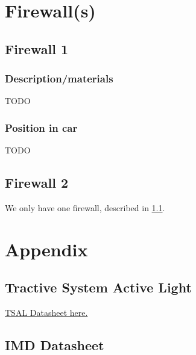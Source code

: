 \documentclass{article}
\begin{document}
\section{Firewall(s)}\label{firewalls}
\subsection{Firewall 1}\label{firewall_1}
\subsubsection{Description/materials}
TODO

\subsubsection{Position in car}
TODO

\subsection{Firewall 2}\label{firewall_2}
We only have one firewall, described in \ref{firewall_1}.

\section{Appendix}\label{appendix}

\hypertarget{TSALdatasheet}{}
\subsection{Tractive System Active Light}
\href{https://d114hh0cykhyb0.cloudfront.net/pdfs/MSTRB-X-X+Mini+Strobe+LED.pdf}{TSAL Datasheet here.}

\subsection{IMD Datasheet}\label{IMD_datasheet}
\end{document}
